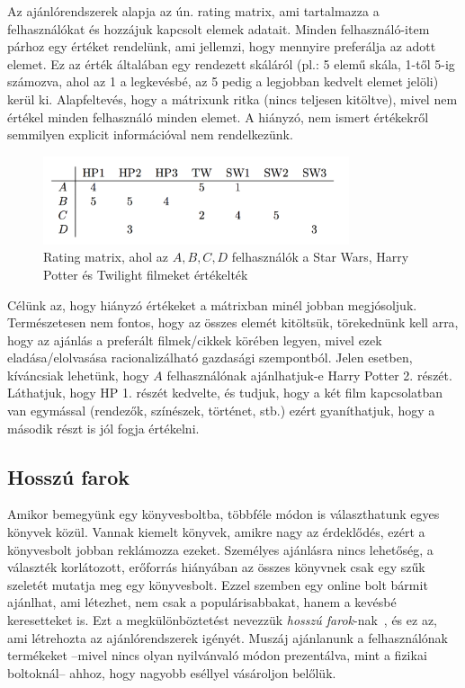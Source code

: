 \documentclass[a4paper,12pt]{article}
\begin{document}
Az ajánlórendszerek alapja az ún. rating matrix, ami tartalmazza a felhasználókat és hozzájuk kapcsolt elemek adatait. Minden felhasználó-item párhoz egy értéket rendelünk, ami jellemzi, hogy mennyire preferálja az adott elemet. Ez az érték általában egy rendezett skáláról (pl.: 5 elemű skála, 1-től 5-ig számozva, ahol az 1 a legkevésbé, az 5 pedig a legjobban kedvelt elemet jelöli) kerül ki. Alapfeltevés, hogy a mátrixunk ritka (nincs teljesen kitöltve), mivel nem értékel minden felhasználó minden elemet. A hiányzó, nem ismert értékekről semmilyen explicit információval nem rendelkezünk.

\begin{figure}[ht!]
\centering
\includegraphics[width=90mm]{img/um.png}
\caption{Rating matrix, ahol az $A,B, C, D$ felhasználók a Star Wars, Harry Potter és Twilight filmeket értékelték \label{um}}
\end{figure}

Célünk az, hogy hiányzó értékeket a mátrixban minél jobban megjósoljuk. Természetesen nem fontos, hogy az összes elemét kitöltsük, törekednünk kell arra, hogy az ajánlás a preferált filmek/cikkek körében legyen, mivel ezek eladása/elolvasása racionalizálható gazdasági szempontból. Jelen esetben, kíváncsiak lehetünk, hogy $A$ felhasználónak ajánlhatjuk-e Harry Potter 2. részét. Láthatjuk, hogy HP 1. részét kedvelte, és tudjuk, hogy a két film kapcsolatban van egymással (rendezők, színészek, történet, stb.) ezért gyaníthatjuk, hogy a második részt is jól fogja értékelni.

\subsection{Hosszú farok}

Amikor bemegyünk egy könyvesboltba, többféle módon is választhatunk egyes könyvek közül. Vannak kiemelt könyvek, amikre nagy az érdeklődés, ezért a könyvesbolt jobban reklámozza ezeket. Személyes ajánlásra nincs lehetőség, a választék korlátozott, erőforrás hiányában az összes könyvnek csak egy szűk szeletét mutatja meg egy könyvesbolt. Ezzel szemben egy online bolt bármit ajánlhat, ami létezhet, nem csak a populárisabbakat, hanem a kevésbé keresetteket is. Ezt a megkülönböztetést nevezzük \textsl{hosszú farok}-nak~\cite{longtail}, és ez az, ami létrehozta az ajánlórendszerek igényét. Muszáj ajánlanunk a felhasználónak termékeket --mivel nincs olyan nyilvánvaló módon prezentálva, mint a fizikai boltoknál-- ahhoz, hogy nagyobb eséllyel vásároljon belőlük.
\end{document}
